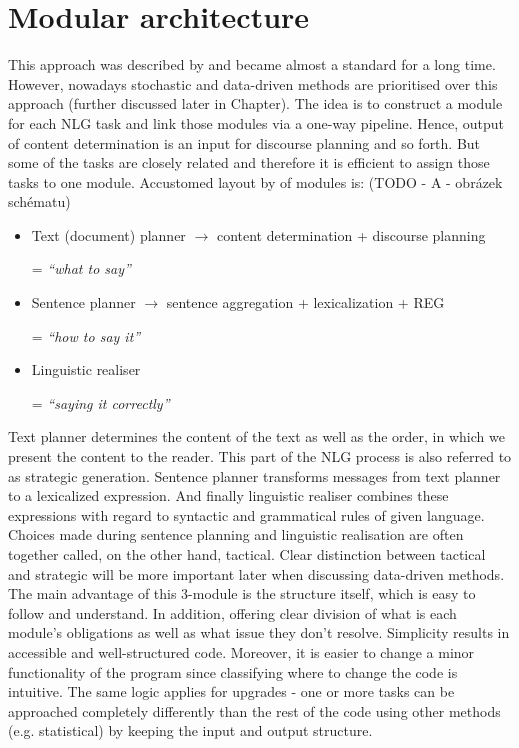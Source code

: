 \section{Modular architecture}
This approach was described by \cite{reiter1997building} and became almost a standard for a long time. However, nowadays stochastic and data-driven methods are prioritised over this approach (further discussed later in Chapter). The idea is to construct a module for each NLG task and link those modules via a one-way pipeline. Hence, output of content determination is an input for discourse planning and so forth. But some of the tasks are closely related and therefore it is efficient to assign those tasks to one module. Accustomed layout by \cite{reiter1997building} of modules is: (TODO - A - obrázek schématu)
\begin{itemize}
	\item Text (document) planner $\rightarrow$ content determination + discourse planning
	
	= \emph{“what to say”}
	\item Sentence planner $\rightarrow$ sentence aggregation + lexicalization + REG
	
	= \emph{“how to say it”}
	\item Linguistic realiser
	
	= \emph{“saying it correctly”}
\end{itemize}

Text planner determines the content of the text as well as the order, in which we present the content to the reader. This part of the NLG process is also referred to as strategic generation. Sentence planner transforms messages from text planner to a lexicalized expression. And finally linguistic realiser combines these expressions with regard to syntactic and grammatical rules of given language. Choices made during sentence planning and linguistic realisation are often together called, on the other hand, tactical. Clear distinction between tactical and strategic will be more important later when discussing data-driven methods.
The main advantage of this 3-module is the structure itself, which is easy to follow and understand. In addition, offering clear division of what is each module’s obligations as well as what issue they don’t resolve. Simplicity results in accessible and well-structured code. Moreover, it is easier to change a minor functionality of the program since classifying where to change the code is intuitive. The same logic applies for upgrades - one or more tasks can be approached completely differently than the rest of the code using other methods (e.g. statistical) by keeping the input and output structure.

